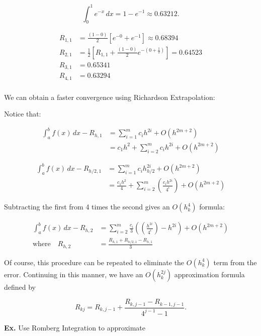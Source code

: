 \documentclass[12pt]{article}
\newcommand{\Ex}{\textbf{Ex.}\xspace}
\begin{document}
\begin{equation*}
  \int_{0}^{1} e^{-x} \, dx = 1-e^{-1} \approx 0.63212
.\end{equation*}

\begin{align*}
R_{1,1} &= \frac{(1-0)}{2} [e^{-0} + e^{-1}] \approx 0.68394 \\
R_{2,1} &= \frac{1}{2}\left[R_{1,1} + \frac{(1-0)}{2}e^{-(0+\frac{1}{2})}
\right] = 0.64523 \\
R_{3,1} &= 0.65341 \\
R_{4,1} &= 0.63294 \\
\end{align*}

We can obtain a faster convergence using Richardson Extrapolation:

Notice that:

\begin{align*}
\int_a^b f(x)\,dx - R_{h,1} 
&= \sum_{i=1}^{m} c_i h^{{2i}} + O(h^{2m+2}) \\
&= c_1 h^2 + \sum_{i=2}^{m} c_i h^{2i} + O(h^{2m+2})
\end{align*}

\begin{align*}
\int_a^b f(x)\,dx - R_{h/2,1} 
&= \sum_{i=1}^{m} c_i h_{h/2}^{2i} + O(h^{2m+2}) \\
&= \frac{c_1 h^2}{4} + \sum_{i=2}^{m} \left(\frac{c_i h^{2i}}{4^i}\right) + O(h^{2m+2})
\end{align*}

Subtracting the first from 4 times the second gives an $O(h_k^4)$ formula:

\begin{align*}
  \int_a^b f(x)\,dx - R_{h,2} 
&= \sum_{i=2}^{m} \frac{c_i}{3} \left( \left( \frac{h^{{2i}}}{4^i} \right) -
h^{2i} \right) + O(h^{2m+2}) \\
  \text{where} \quad R_{h,2} &= \frac{R_{h,1} + R_{h/2,1} - R_{h,1}}{3}
\end{align*}

Of course, this procedure can be repeated to eliminate the $O(h_k^4)$ term from
the error. Continuing in this manner, we have an $O(h_k^{2j})$ approximation
formula defined by 

\begin{equation*}
  R_{kj} = R_{k, j-1} + \frac{R_{k,j-1} - R_{k-1, j-1}}{4^{j-1}-1}
.\end{equation*}

\Ex Use Romberg Integration to approximate 
\end{document}
